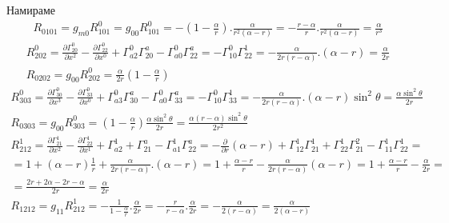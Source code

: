\documentclass[a4paper,12pt]{article}
\begin{document}
    Намираме 
    \begin{equation*}
        \begin{aligned}
            R_{0101} = g_{m0}R^0_{101} = g_{00}R^0_{101} = -\left( 1-\frac{\alpha}{r}\right).\frac{\alpha}{r^2(\alpha -r)} = - \frac{r-\alpha}{r}.\frac{\alpha}{r^2(\alpha-r)} = \frac{\alpha}{r^3}
        \end{aligned}
    \end{equation*}
    \newline
    \begin{equation*}
        \begin{aligned}
            R^0_{202} = \frac{\partial\varGamma^0_{20}}{\partial x^2} - \frac{\partial\varGamma^0_{22}}{\partial x^0} + \varGamma^0_{a2}\varGamma^a_{20}-\varGamma^0_{a0}\varGamma^a_{22}
            = -\varGamma^0_{10}\varGamma^1_{22} = -\frac{\alpha}{2r(r-\alpha)}.(\alpha-r)=\frac{\alpha}{2r}
            \\
            R_{0202}=g_{00}R^0_{202} = \frac{\alpha}{2r}\left( 1-\frac{\alpha}{r} \right)
        \end{aligned}
    \end{equation*}
    \newline
    \begin{equation*}
        \begin{aligned}
            R^0_{303} = \frac{\partial \varGamma^0_{30}}{\partial x^3} - \frac{\partial\varGamma^0_{33}}{\partial x^0} + \varGamma^0_{a3}\varGamma^a_{30} - \varGamma^0_{a0}\varGamma^a_{33}
            = - \varGamma^0_ {10}\varGamma^1_{33} = -\frac{\alpha}{2r(r-\alpha)}.(\alpha-r)\sin^2\theta = \frac{\alpha\sin^2\theta}{2r}
            \\
            R_{0303}=g_{00}R^0_{303} = \left( 1- \frac{\alpha}{r} \right) \frac{\alpha\sin^2\theta}{2r} = \frac{\alpha(r-\alpha)\sin^2\theta}{2r^2}
        \end{aligned}
    \end{equation*}
    \newline
    \begin{equation*}
        \begin{aligned}
            R^1_{212} = \frac{\partial\varGamma^1_{21}}{\partial x^2} - \frac{\partial\varGamma^1_{22}}{\partial x^1} + \varGamma^1_{a2} + \varGamma^a_{21} - \varGamma^1_{a1}\varGamma^a_{22}
            = - \frac{\partial}{\partial r} (\alpha-r) + \varGamma^1_{12}\varGamma^1_{21}+\varGamma^1_{22}\varGamma^2_{21}-\varGamma^1_{11}\varGamma^1_{22} = \\
            =1 + (\alpha - r)\frac{1}{r}+\frac{\alpha}{2r(r-\alpha)}.(\alpha-r) = 1+\frac{\alpha-r}{r} - \frac{\alpha}{2r(r-\alpha)}(\alpha-r)=1+\frac{\alpha-r}{r}-\frac{\alpha}{2r} = \\
            = \frac{2r+2\alpha-2r-\alpha}{2r} = \frac{\alpha}{2r}
            \\
            R_{1212}=g_{11}R^1_{212}=-\frac{1}{1-\frac{\alpha}{r}}.\frac{\alpha}{2r}= - \frac{r}{r-\alpha}.\frac{\alpha}{2r}=-\frac{\alpha}{2(r-\alpha)} =\frac{\alpha}{2(\alpha-r)}
        \end{aligned}
    \end{equation*}
\end{document}
